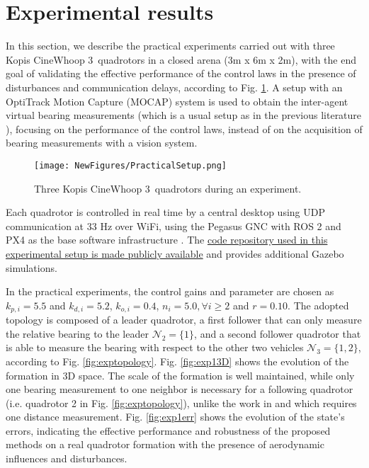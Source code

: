 \section{Experimental results} \label{sec:experiments}
In this section, we describe the practical experiments carried out with three Kopis CineWhoop 3\textquotesingle\textquotesingle\, quadrotors in a closed arena (3m x 6m x 2m), with the end goal of validating the effective performance of the control laws in the presence of disturbances and communication delays, according to Fig. \ref{fig:expshot}. A setup with an OptiTrack Motion Capture (MOCAP) system is used to obtain the inter-agent virtual bearing measurements (which is a usual setup as in the previous literature \cite{schiano2016rigidity,erskine2021model}), focusing on the performance of the control laws, instead of on the acquisition of bearing measurements with a vision system. 
\begin{figure}%
    \centering
    \texttt{[image: NewFigures/PracticalSetup.png]}
    \vspace{-0.5cm}
    \caption{Three Kopis CineWhoop 3\textquotesingle\textquotesingle\, quadrotors during an experiment.}
    \label{fig:expshot}
\end{figure}
Each quadrotor is controlled in real time by a central desktop using UDP communication at 33 Hz over WiFi, using the Pegasus GNC with ROS 2 and PX4 as the base software infrastructure \cite{10556959}. The \href{https://github.com/SDoodeman/bpe_quadrotor}{code repository used in this experimental setup is made publicly available} and provides additional Gazebo simulations.

In the practical experiments, the control gains and parameter are chosen as $k_{p,i}=5.5$ and $k_{d,i}=5.2$, $k_{o,i}=0.4$, $n_i=5.0, \forall i\ge 2$ and $r=0.10$. The adopted topology is composed of a leader quadrotor, a first follower that can only measure the relative bearing to the leader $\mathcal{N}_2 = \{1\}$, and a second follower quadrotor that is able to measure the bearing with respect to the other two vehicles $\mathcal{N}_3 = \{1, 2\}$, according to Fig. \ref{fig:exptopology}. Fig. \ref{fig:exp13D} shows the evolution of the formation in 3D space. The scale of the formation is well maintained, while only one bearing measurement to one neighbor is necessary for a following quadrotor (i.e. quadrotor 2 in Fig. \ref{fig:exptopology}), unlike the work in \cite{schiano2016rigidity} and \cite{erskine2021model} which requires one distance measurement.  Fig. \ref{fig:exp1err} shows the evolution of the state's errors, indicating the effective performance and robustness of the proposed methods on a real quadrotor formation with the presence of aerodynamic influences and disturbances.

